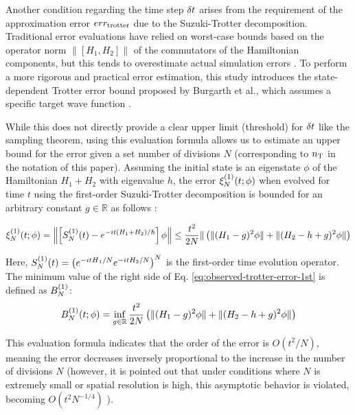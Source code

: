 \documentclass[report_2025.tex]{subfiles}
\begin{document}
Another condition regarding the time step $\delta t$ arises from the requirement
of the approximation error $err_{\mathrm{trotter}}$ due to the Suzuki-Trotter
decomposition. Traditional error evaluations have relied on worst-case bounds
based on the operator norm $\| [H_1,H_2] \|$ of the commutators of the
Hamiltonian components, but this tends to overestimate actual simulation errors
\cite{Childs2021.PhysRevX.11.011020}. To perform a more rigorous and practical
error estimation, this study introduces the state-dependent Trotter error bound
proposed by Burgarth et al., which assumes a specific target wave function
\cite{Burgarth2024.PhysRevResearch.6.043155}.

While this does not directly provide a clear upper limit (threshold) for
$\delta t$ like the sampling theorem, using this evaluation formula allows us to
estimate an upper bound for the error given a set number of divisions $N$
(corresponding to $n_{\mathrm{T}}$ in the notation of this paper). Assuming the initial
state is an eigenstate $\phi$ of the Hamiltonian $H_1+H_2$ with eigenvalue $h$,
the error $\xi_{N}^{(1)}(t;\phi)$ when evolved for time $t$ using the first-order
Suzuki-Trotter decomposition is bounded for an arbitrary constant
$g\in\mathbb{R}$ as follows \cite{Burgarth2024.PhysRevResearch.6.043155}:

\begin{equation}
    \xi_{N}^{(1)}(t;\phi)=\left\|\left[S_{N}^{(1)}(t)-e^{-it(H_1+H_2)/\hbar}\right]\phi\right\|
    \leq\frac{t^2}{2N}\| \left(\|(H_1-g)^2\phi\|+\|(H_2-h+g)^2\phi\|\right)
    \label{eq:observed-trotter-error-1st}
\end{equation}

Here, $S_{N}^{(1)}(t) = \left(e^{-i{tH}_1/N}e^{-itH_2/N}\right)^N$ is the first-order time evolution operator. The minimum value of the right side of Eq. \eqref{eq:observed-trotter-error-1st} is defined as $B_{N}^{(1)}$:
\begin{equation}
B_{N}^{(1)}(t;\phi)=\inf_{g\in\mathbb{R}}\frac{t^2}{2N}
    \left(\|(H_1-g)^2\phi\|+\|(H_2-h+g)^2\phi\|\right)
\label{eq:observed-trotter-error-bound-1st}
\end{equation}

This evaluation formula indicates that the order of the error is $O(t^2/N)$,
meaning the error decreases inversely proportional to the increase in the number
of divisions $N$ (however, it is pointed out that under conditions where $N$ is
extremely small or spatial resolution is high, this asymptotic behavior is
violated, becoming $O(t^2 N^{-1/4})$
\cite{Burgarth2024.PhysRevResearch.6.043155}).
\end{document}
